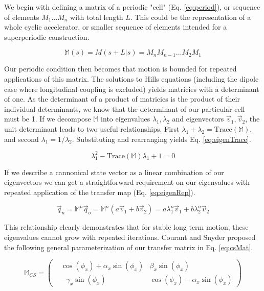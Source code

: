 We begin with defining a matrix of a periodic "cell" (Eq. \ref{eq:period}), or sequence of elements $M_1 \dots M_n$ with total length $L$. This could be the representation of a whole cyclic accelerator, or smaller sequence of elements intended for a superperiodic construction.

\begin{equation} \label{eq:period}
	\mathbb{M}(s) = M(s+L|s) = M_nM_{n-1}\dots M_2M_1
\end{equation}

Our periodic condition then becomes that motion is bounded for repeated applications of this matrix. The solutions to Hills equations (including the dipole case where longitudinal coupling is excluded) yields matricies with a determinant of one. As the determinant of a product of matricies is the product of their individual determinants, we know that the determinant of our particular cell must be 1. If we decompose $\mathbb{M}$ into eigenvalues $\lambda_1, \lambda_2$ and eigenvectors $\vec{v}_1, \vec{v}_2$, the unit determinant leads to two useful relationships. First $\lambda_1 + \lambda_2 = \mathrm{Trace}(\mathbb{M})$, and second $\lambda_1 = 1/\lambda_2$. Substituting and rearranging yields Eq. \ref{eq:eigenTrace}.

\begin{equation} \label{eq:eigenTrace}
	\lambda_1^2 - \mathrm{Trace}(\mathbb{M})\lambda_1 + 1 = 0
\end{equation}

If we describe a cannonical state vector as a linear combination of our eigenvectors we can get a straightforward requirement on our eigenvalues with repeated application of the transfer map (Eq. \ref{eq:eigenRep}).

\begin{equation} \label{eq:eigenRep}
	\vec{q}_n = \mathbb{M}^n\vec{q}_o = \mathbb{M}^n(a \vec{v}_1 + b \vec{v}_2) = a \lambda_1^n \vec{v}_1 + b \lambda_2^n \vec{v}_2
\end{equation}

This relationship clearly demonstrates that for stable long term motion, these eigenvalues cannot grow with repeated iterations. Courant and Snyder proposed the following general parameterization of our transfer matrix in Eq. \ref{eq:csMat}.

\begin{equation} \label{eq:csMat}
	\mathbb{M}_{CS} = 
\begin{pmatrix}
&\cos{\left(\phi_x\right)} + \alpha_x\sin{\left(\phi_x\right)} &\beta_x\sin{\left(\phi_x\right)}\\
&-\gamma_x\sin{\left(\phi_x\right)} &\cos{\left(\phi_x\right)} - \alpha_x\sin{\left(\phi_x\right)}\end{pmatrix}
\end{equation}

